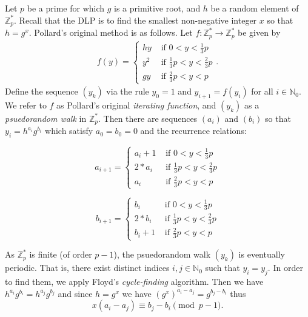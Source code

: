 \documentclass{article}
\newcommand{\ZZ}{\mathbb{Z}}
\newcommand{\NN}{\mathbb{N}}
\begin{document}
Let $p$ be a prime for which $g$ is a primitive root, and $h$ be a random element of $\ZZ_p^*$. Recall that the DLP is to find the smallest non-negative integer $x$ so that $h=g^x$. Pollard's original method is as follows. Let $f: \ZZ_p^* \to \ZZ_p^*$ be given by
\begin{align*}
	f(y) = \begin{cases}
		hy & \text{ if } 0 < y < \frac{1}{3}p \\
		y^2 & \text{ if } \frac{1}{3}p < y < \frac{2}{3}p \\
		gy & \text{ if } \frac{2}{3}p < y < p
		\end{cases}.
\end{align*}
Define the sequence $(y_k)$ via the rule $y_0 = 1$ and $y_{i+1}=f(y_i)$ for all $i \in \NN_0$. We refer to $f$ as Pollard's original \textit{iterating function}, and $(y_k)$ as a \textit{psuedorandom walk} in $\ZZ_p^*$. Then there are sequences $(a_i)$ and $(b_i)$ so that $y_i=h^{a_i}g^{b_i}$ which satisfy $a_0=b_0=0$ and the recurrence relations:

\noindent\begin{minipage}{.5\linewidth}
\begin{equation*}
	a_{i+1} = \begin{cases}
		a_i + 1 & \text{ if } 0 < y < \frac{1}{3}p \\
		2 * a_i & \text{ if } \frac{1}{3}p < y < \frac{2}{3}p \\
		a_i & \text { if } \frac{2}{3}p < y < p
		\end{cases}
\end{equation*}
\end{minipage}
\begin{minipage}{.5\linewidth}
\begin{equation*}
	b_{i+1} = \begin{cases}
		b_i & \text{ if } 0 < y < \frac{1}{3}p \\
		2 * b_i & \text{ if } \frac{1}{3}p < y < \frac{2}{3}p \\
		b_i+1 & \text { if } \frac{2}{3}p < y < p
		\end{cases}
\end{equation*}
\end{minipage}
\vspace{1em}

As $\ZZ_p^*$ is finite (of order $p-1$), the psuedorandom walk $(y_k)$ is eventually periodic. That is, there exist distinct indices $i,j \in \NN_0$ such that $y_i=y_j$. In order to find them, we apply Floyd's \textit{cycle-finding} algorithm.
Then we have $h^{a_i}g^{b_i} = h^{a_j}g^{b_j}$ and since $h=g^x$ we have $(g^x)^{a_i-a_j} = g^{b_j-b_i}$ thus $$x(a_i-a_j) \equiv b_j-b_i \pmod {p-1}.$$
\end{document}
